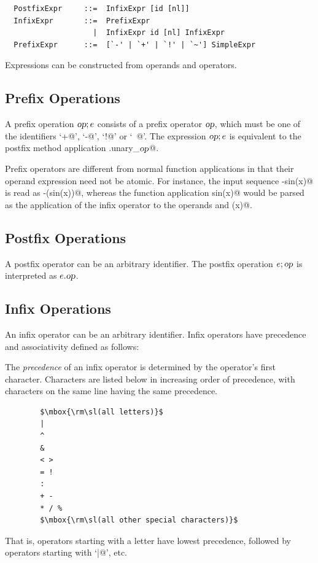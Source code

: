 \syntax\begin{lstlisting}
  PostfixExpr     ::=  InfixExpr [id [nl]]
  InfixExpr       ::=  PrefixExpr
                    |  InfixExpr id [nl] InfixExpr
  PrefixExpr      ::=  [`-' | `+' | `!' | `~'] SimpleExpr 
\end{lstlisting}

Expressions can be constructed from operands and operators. 

\subsection{Prefix Operations}

A prefix operation $\mbox{\sl op};e$ consists of a prefix operator $\mbox{\sl op}$, which
must be one of the identifiers `\lstinline@+@', `\lstinline@-@',
`\lstinline@!@' or `\lstinline@~@'. The expression $\mbox{\sl op};e$ is
equivalent to the postfix method application
\lstinline@e.unary_$\mbox{\sl op}$@.


Prefix operators are different from normal function applications in
that their operand expression need not be atomic. For instance, the
input sequence \lstinline@-sin(x)@ is read as \lstinline@-(sin(x))@, whereas the
function application \lstinline@negate sin(x)@ would be parsed as the
application of the infix operator  to the operands
 and \lstinline@(x)@.

\subsection{Postfix Operations}

A postfix operator can be an arbitrary identifier. The postfix
operation $e;\mbox{\sl op}$ is interpreted as $e.\mbox{\sl op}$. 

\subsection{Infix Operations}

An infix operator can be an arbitrary identifier. Infix operators have
precedence and associativity defined as follows:

The {\em precedence} of an infix operator is determined by the operator's first
character. Characters are listed below in increasing order of
precedence, with characters on the same line having the same precedence.
\begin{lstlisting}
        $\mbox{\rm\sl(all letters)}$
        |
        ^
        &
        < >
        = !
        :
        + -
        * / %
        $\mbox{\rm\sl(all other special characters)}$
\end{lstlisting}
That is, operators starting with a letter have lowest precedence,
followed by operators starting with `\lstinline@|@', etc.


